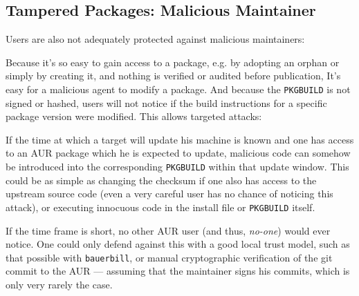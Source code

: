\subsection*{Tampered Packages: Malicious Maintainer}
Users are also not adequately protected against malicious maintainers:

Because it's so easy to gain access to a package, e.g. by adopting an orphan or simply by creating it, and nothing is verified or audited before publication, It's easy for a malicious agent to modify a package.
And because the \texttt{PKGBUILD} is not signed or hashed, users will not notice if the build instructions for a specific package version were modified. This allows targeted attacks:

If the time at which a target will update his machine is known and one has access to an AUR package which he is expected to update, malicious code can somehow be introduced into the corresponding \texttt{PKGBUILD} within that update window.
This could be as simple as changing the checksum if one also has access to the upstream source code (even a very careful user has no chance of noticing this attack), or executing innocuous code in the install file or \texttt{PKGBUILD} itself.

If the time frame is short, no other AUR user (and thus, \emph{no-one}) would ever notice.
One could only defend against this with a good local trust model, such as that possible with \texttt{bauerbill}, or manual cryptographic verification of the git commit to the AUR --- assuming that the maintainer signs his commits, which is only very rarely the case.


